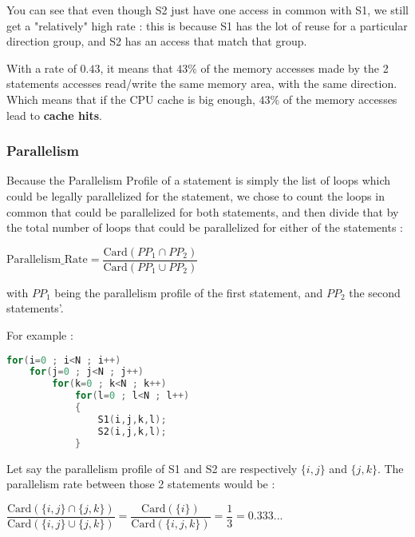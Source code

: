 \documentclass[paper=a4, fontsize=11.5pt]{scrartcl}
\numberwithin{equation}{section}        %
\numberwithin{figure}{section}          %
\numberwithin{table}{section}               %
\begin{document}
        \bigskip

        You can see that even though S2 just have one access in common with S1, we still get
        a "relatively" high rate : this is because S1 has the lot of reuse for a particular
        direction group, and S2 has an access that match that group.

        With a rate of $0.43$, it means that $43\%$ of the memory accesses made by the 2 statements accesses
        read/write the same memory area, with the same direction. Which means that if the
        CPU cache is big enough, $43\%$ of the memory accesses lead to \textbf{cache hits}.
            
        \subsubsection{Parallelism}
            Because the Parallelism Profile of a statement is simply the list of loops
            which could be legally parallelized for the statement, we chose to count the
            loops in common that could be parallelized for both statements, and then
            divide that by the total number of loops that could be parallelized for either
            of the statements :
            \begin{center}
                $ \mathrm{Parallelism\_Rate} =  \dfrac{\mathrm{Card}( {PP_1} \cap {PP_2})}{\mathrm{Card}({PP_1} \cup {PP_2})}$
            \end{center}
            with $PP_1$ being the parallelism profile of the first statement, and $PP_2$ 
            the second statements'.

            \bigskip

            For example :
\begin{lstlisting}[frame=single, language=C, caption={Parallelism profile rating example}, label={lst:pp_example}]
for(i=0 ; i<N ; i++)
    for(j=0 ; j<N ; j++)
        for(k=0 ; k<N ; k++)
            for(l=0 ; l<N ; l++)
            {
                S1(i,j,k,l);
                S2(i,j,k,l);
            }
\end{lstlisting}
        Let say the parallelism profile of S1 and S2 are respectively $\{i,j\}$ and $\{j,k\}$.
        The parallelism rate between those 2 statements would be :
        \begin{center}
            $\dfrac{\mathrm{Card}( \{i,j\} \cap \{j,k\})}{\mathrm{Card}( \{i,j\} \cup \{j,k\})}
            = \dfrac{\mathrm{Card}( \{i\})}{\mathrm{Card}( \{i,j,k\})}
            = \dfrac{1}{3}
            = 0.333...$
        \end{center}
\end{document}
